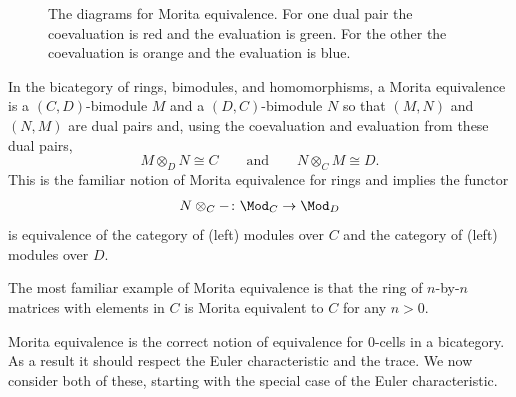 \documentclass[11pt]{amsart}
\begin{document}
\begin{figure}
{
\hspace{.5cm}\raisebox{1.5cm}{=}\hspace{.5cm}
%
}
\caption{The diagrams for Morita equivalence.  For one dual pair the coevaluation is red and the evaluation is green.  For the other the coevaluation is orange and the evaluation is blue. }
\label{fig:morita}
\end{figure}

\begin{example}
In the bicategory of rings, bimodules, and homomorphisms, a Morita equivalence is a $(C,D)$-bimodule $M$ and a $(D,C)$-bimodule $N$ so that  $(M,N)$ and $(N,M)$ are dual pairs and, using the coevaluation and evaluation from these dual pairs, 
 \[
  M\otimes_DN\cong C\qquad\text{and} \qquad N\otimes_CM\cong D.
 \]
This is the familiar notion of Morita equivalence for rings and implies the  functor 
\[
 N\otimes_C- \colon \Mod_C\to \Mod_D
\] 
is equivalence of the category of (left) modules over $C$ and the category of (left) modules over $D$. 

The most familiar example of Morita equivalence is that the ring of $n$-by-$n$ matrices with elements in $C$ is Morita equivalent to $C$ for any $n > 0$. 
\end{example}

Morita equivalence is the correct notion of equivalence for 0-cells in a bicategory.  
As a result it should respect the Euler characteristic and the trace.  We now consider both of these, starting with the special case of the Euler characteristic. 
\end{document}
